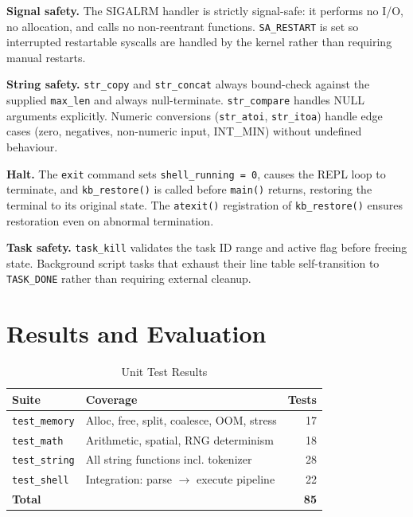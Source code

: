 \documentclass[conference]{IEEEtran}
\begin{document}
\textbf{Signal safety.} The SIGALRM handler is strictly signal-safe: it performs no I/O, no allocation, and calls no non-reentrant functions. \texttt{SA\_RESTART} is set so interrupted restartable syscalls are handled by the kernel rather than requiring manual restarts.

\textbf{String safety.} \texttt{str\_copy} and \texttt{str\_concat} always bound-check against the supplied \texttt{max\_len} and always null-terminate. \texttt{str\_compare} handles NULL arguments explicitly. Numeric conversions (\texttt{str\_atoi}, \texttt{str\_itoa}) handle edge cases (zero, negatives, non-numeric input, INT\_MIN) without undefined behaviour.

\textbf{Halt.} The \texttt{exit} command sets \texttt{shell\_running = 0}, causes the REPL loop to terminate, and \texttt{kb\_restore()} is called before \texttt{main()} returns, restoring the terminal to its original state. The \texttt{atexit()} registration of \texttt{kb\_restore()} ensures restoration even on abnormal termination.

\textbf{Task safety.} \texttt{task\_kill} validates the task ID range and active flag before freeing state. Background script tasks that exhaust their line table self-transition to \texttt{TASK\_DONE} rather than requiring external cleanup.

\section{Results and Evaluation}

\begin{table}[H]
\centering
\caption{Unit Test Results}
\begin{tabular}{llr}
\toprule
\textbf{Suite} & \textbf{Coverage} & \textbf{Tests} \\
\midrule
\texttt{test\_memory} & Alloc, free, split, coalesce, OOM, stress & 17 \\
\texttt{test\_math}   & Arithmetic, spatial, RNG determinism     & 18 \\
\texttt{test\_string} & All string functions incl. tokenizer     & 28 \\
\texttt{test\_shell}  & Integration: parse $\to$ execute pipeline  & 22 \\
\midrule
\textbf{Total}        &                                          & \textbf{85} \\
\bottomrule
\end{tabular}
\label{tab:tests}
\end{table}
\end{document}
